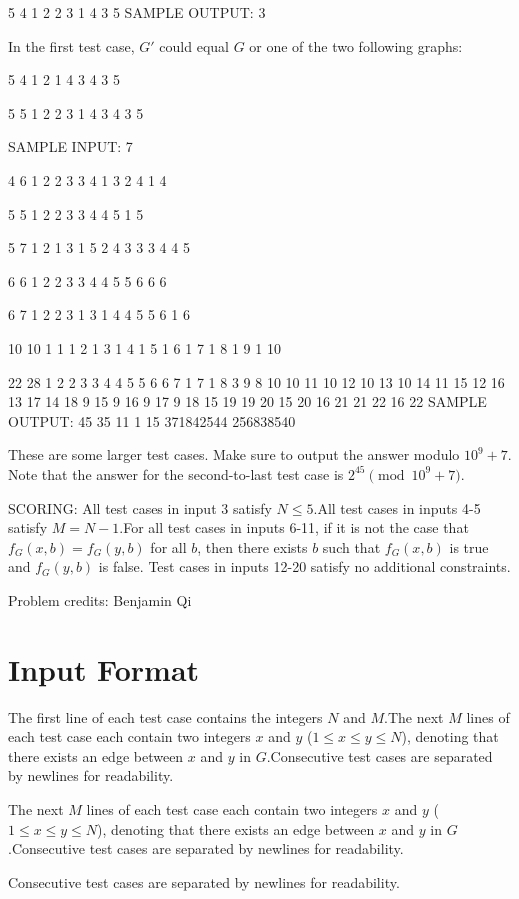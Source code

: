 \documentclass[12pt]{article}
\begin{document}
5 4
1 2
2 3
1 4
3 5
SAMPLE OUTPUT: 
3

In the first test case, $G'$ could equal $G$ or one of the two following graphs:


5 4
1 2
1 4
3 4
3 5


5 5
1 2
2 3
1 4
3 4
3 5

SAMPLE INPUT:
7

4 6
1 2
2 3
3 4
1 3
2 4
1 4

5 5
1 2
2 3
3 4
4 5
1 5

5 7
1 2
1 3
1 5
2 4
3 3
3 4
4 5

6 6
1 2
2 3
3 4
4 5
5 6
6 6

6 7
1 2
2 3
1 3
1 4
4 5
5 6
1 6

10 10
1 1
1 2
1 3
1 4
1 5
1 6
1 7
1 8
1 9
1 10

22 28
1 2
2 3
3 4
4 5
5 6
6 7
1 7
1 8
3 9
8 10
10 11
10 12
10 13
10 14
11 15
12 16
13 17
14 18
9 15
9 16
9 17
9 18
15 19
19 20
15 20
16 21
21 22
16 22
SAMPLE OUTPUT: 
45
35
11
1
15
371842544
256838540

These are some larger test cases. Make sure to output the answer modulo
$10^9+7$. Note that the answer for the second-to-last test case is
$2^{45}\pmod{10^9+7}$.

SCORING:
All test cases in input 3 satisfy $N\le 5$.All test cases in inputs 4-5 satisfy $M=N-1$.For all test cases in inputs 6-11, if it is not the case that
$f_G(x,b)=f_G(y,b)$ for all $b$, then there exists $b$ such that $f_G(x,b)$ is
true and $f_G(y,b)$ is false.
Test cases in inputs 12-20 satisfy no additional constraints.


Problem credits: Benjamin Qi



\section*{Input Format}
The first line of each test case contains the integers $N$ and $M$.The next $M$ lines of each test case each contain two integers $x$ and $y$
($1\le x\le y\le N$), denoting that there exists an edge between $x$ and $y$ in
$G$.Consecutive test cases are separated by newlines for readability.

The next $M$ lines of each test case each contain two integers $x$ and $y$
($1\le x\le y\le N$), denoting that there exists an edge between $x$ and $y$ in
$G$.Consecutive test cases are separated by newlines for readability.

Consecutive test cases are separated by newlines for readability.
\end{document}
